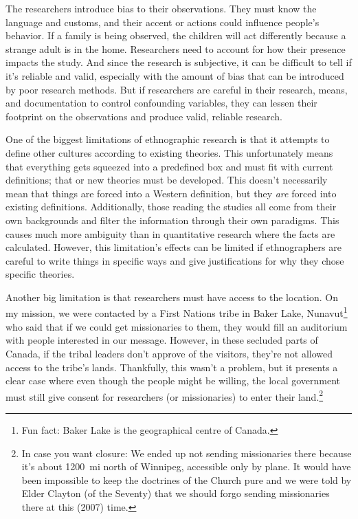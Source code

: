 \documentclass[12pt]{article}
\begin{document}
The researchers introduce bias to their observations. They must know the language and customs, and their accent or actions could influence people's behavior. If a family is being observed, the children will act differently because a strange adult is in the home. Researchers need to account for how their presence impacts the study. And since the research is subjective, it can be difficult to tell if it's reliable and valid, especially with the amount of bias that can be introduced by poor research methods. But if researchers are careful in their research, means, and documentation to control confounding variables, they can lessen their footprint on the observations and produce valid, reliable research.

One of the biggest limitations of ethnographic research is that it attempts to define other cultures according to existing theories. This unfortunately means that everything gets squeezed into a predefined box and must fit with current definitions; that or new theories must be developed. This doesn't necessarily mean that things are forced into a Western definition, but they \emph{are} forced into existing definitions. Additionally, those reading the studies all come from their own backgrounds and filter the information through their own paradigms. This causes much more ambiguity than in quantitative research where the facts are calculated. However, this limitation's effects can be limited if ethnographers are careful to write things in specific ways and give justifications for why they chose specific theories.

Another big limitation is that researchers must have access to the location. On my mission, we were contacted by a First Nations tribe in Baker Lake, Nunavut\footnote{Fun fact: Baker Lake is the geographical centre of Canada.} who said that if we could get missionaries to them, they would fill an auditorium with people interested in our message. However, in these secluded parts of Canada, if the tribal leaders don't approve of the visitors, they're not allowed access to the tribe's lands. Thankfully, this wasn't a problem, but it presents a clear case where even though the people might be willing, the local government must still give consent for researchers (or missionaries) to enter their land.\footnote{In case you want closure: We ended up not sending missionaries there because it's about 1200~mi north of Winnipeg, accessible only by plane. It would have been impossible to keep the doctrines of the Church pure and we were told by Elder Clayton (of the Seventy) that we should forgo sending missionaries there at this (2007) time.}
\end{document}
